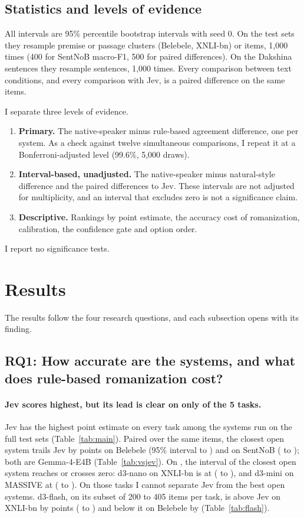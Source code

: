\documentclass[11pt]{article}
\begin{document}
\subsection{Statistics and levels of evidence}
All intervals are 95\% percentile bootstrap intervals with seed 0.
On the test sets they resample premise or passage clusters (Belebele, XNLI-bn) or items, 1,000 times (400 for SentNoB macro-F1, 500 for paired differences).
On the Dakshina sentences they resample sentences, 1,000 times.
Every comparison between text conditions, and every comparison with Jev, is a paired difference on the same items.

I separate three levels of evidence.
\begin{enumerate}
\item \textbf{Primary.} The native-speaker minus rule-based agreement difference, one per system. As a check against twelve simultaneous comparisons, I repeat it at a Bonferroni-adjusted level (99.6\%, 5,000 draws).
\item \textbf{Interval-based, unadjusted.} The native-speaker minus natural-style difference and the paired differences to Jev. These intervals are not adjusted for multiplicity, and an interval that excludes zero is not a significance claim.
\item \textbf{Descriptive.} Rankings by point estimate, the accuracy cost of romanization, calibration, the confidence gate and option order.
\end{enumerate}
I report no significance tests.

\section{Results}
\label{sec:results}
The results follow the four research questions, and each subsection opens with its finding.
\subsection{RQ1: How accurate are the systems, and what does rule-based romanization cost?}
\label{sec:acc}
\paragraph{Jev scores highest, but its lead is clear on only \jevSepN{} of the 5 tasks.}
Jev has the highest point estimate on every task among the systems run on the full test sets (Table~\ref{tab:main}).
Paired over the same items, the closest open system trails Jev by \pdBel{} points on Belebele (95\% interval \pdBelLo{} to \pdBelHi) and \pdSent{} on SentNoB (\pdSentLo{} to \pdSentHi); both are Gemma-4-E4B (Table~\ref{tab:vsjev}).
On \jevTiedTasks, the interval of the closest open system reaches or crosses zero: d3-nano on XNLI-bn is at \pdXnli{} (\pdXnliLo{} to \pdXnliHi), and d3-mini on MASSIVE at \pdMas{} (\pdMasLo{} to \pdMasHi).
On those tasks I cannot separate Jev from the best open systems.
d3-flash, on its subset of 200 to 405 items per task, is above Jev on XNLI-bn by \pdFlashXnli{} points (\pdFlashXnliLo{} to \pdFlashXnliHi) and below it on Belebele by \pdFlashBel{} (Table~\ref{tab:flash}).
\end{document}
